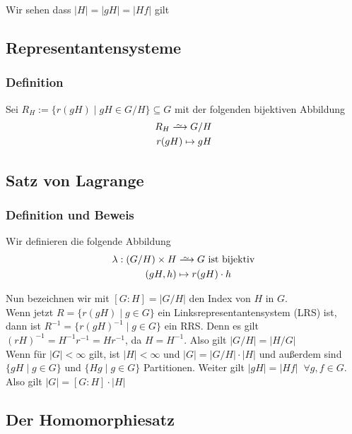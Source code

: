 \documentclass[12pt, german]{article}
\newcommand\iso{\xrightarrow{
		\,\smash{\raisebox{-0.65ex}{\ensuremath{\scriptstyle\sim}}}\,}}
\begin{document}
Wir sehen dass $|H|=|gH| = |Hf|$ gilt

\subsection{Representantensysteme}		
\subsubsection{Definition}
	Sei $R_H := \{r(gH) \mid gH \in G/H\} \subseteq G$ mit der folgenden bijektiven  Abbildung
	\begin{align*}
		R_H \iso G/H \\
		r(gH) \mapsto gH 
	\end{align*}

\subsection{Satz von Lagrange}		
\subsubsection{Definition und Beweis}
	Wir definieren die folgende Abbildung
	\begin{align*}
		\lambda: (G/H) \times H &\iso G \text{ ist bijektiv} \\
		(gH, h) &\mapsto r(gH) \cdot h
	\end{align*}
	 
	Nun bezeichnen wir mit $[G:H] = |G/H|$ den Index von $H$ in $G$. \\ 
	Wenn jetzt $R = \{r(gH) \mid g \in G \}$ ein Linksrepresentantensystem (LRS) ist, \\ 
	dann ist $R^{-1} = \{r(gH)^{-1} \mid g \in G \}$ ein RRS. 
	Denn es gilt $(rH)^{-1} = H^{-1}r^{-1} = Hr^{-1}$, da $H=H^{-1}$.
	Also gilt $|G/H| = |H/G|$ \\
	
	Wenn für $|G| < \infty $ gilt, ist $|H| < \infty $ und $|G| = |G/H| \cdot |H|$ und 
	außerdem sind $\{gH \mid g \in G \}$ und $\{Hg \mid g \in G \}$ Partitionen. Weiter gilt $|gH| = |Hf| \;\;\forall g,f \in G$. \\
	Also gilt $|G| = [G:H] \cdot |H|$ 


\subsection{Der Homomorphiesatz}		
\end{document}
